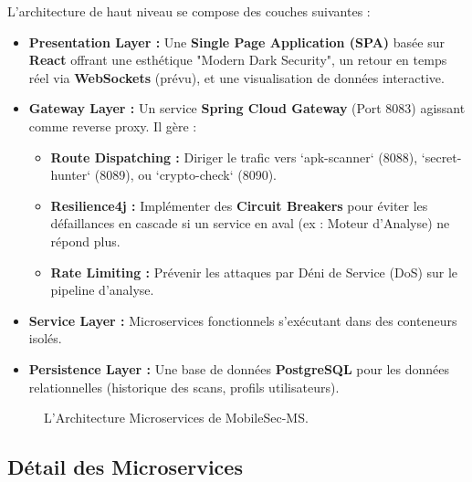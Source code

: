 \documentclass[
  journal=largetwo,
  manuscript=article-type,
  year=2025,
  volume=1,
]{cup-journal}
\begin{document}
L'architecture de haut niveau se compose des couches suivantes :
\begin{itemize}
    \item \textbf{Presentation Layer :} Une \textbf{Single Page Application (SPA)} basée sur \textbf{React} offrant une esthétique "Modern Dark Security", un retour en temps réel via \textbf{WebSockets} (prévu), et une visualisation de données interactive.
    \item \textbf{Gateway Layer :} Un service \textbf{Spring Cloud Gateway} (Port 8083) agissant comme reverse proxy. Il gère :
    \begin{itemize}
        \item \textbf{Route Dispatching :} Diriger le trafic vers `apk-scanner` (8088), `secret-hunter` (8089), ou `crypto-check` (8090).
        \item \textbf{Resilience4j :} Implémenter des \textbf{Circuit Breakers} pour éviter les défaillances en cascade si un service en aval (ex : Moteur d'Analyse) ne répond plus.
        \item \textbf{Rate Limiting :} Prévenir les attaques par Déni de Service (DoS) sur le pipeline d'analyse.
    \end{itemize}
    \item \textbf{Service Layer :} Microservices fonctionnels s'exécutant dans des conteneurs isolés.
    \item \textbf{Persistence Layer :} Une base de données \textbf{PostgreSQL} pour les données relationnelles (historique des scans, profils utilisateurs).
\end{itemize}

\begin{figure}
\centering
{}
\caption{L'Architecture Microservices de MobileSec-MS.}
\label{fig:arch}
\end{figure}


\subsection{Détail des Microservices}
\end{document}
